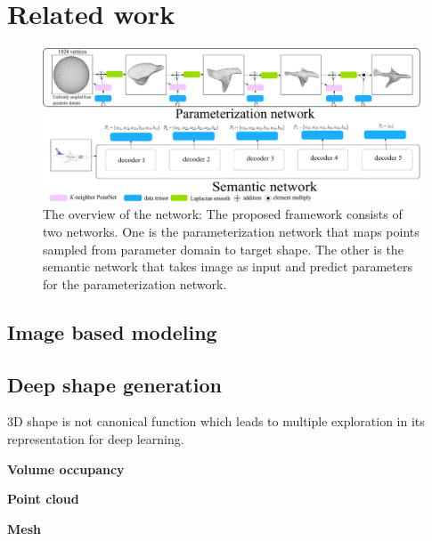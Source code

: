 \section{Related work}
\begin{figure}[htbp]
	\centering
	\includegraphics[width=\linewidth]{img/net/overview}
	\caption{The overview of the network: The proposed framework consists of two networks. One is the parameterization network that maps points sampled from parameter domain to target shape. The other is the semantic network that takes image as input and predict parameters for the parameterization network.}
	\label{fig:overview}
\end{figure}
\subsection{Image based modeling}
\subsection{Deep shape generation}
3D shape is not canonical function which leads to multiple exploration in its representation for deep learning.

\noindent\textbf{Volume occupancy}

\noindent\textbf{Point cloud}

\noindent\textbf{Mesh}
